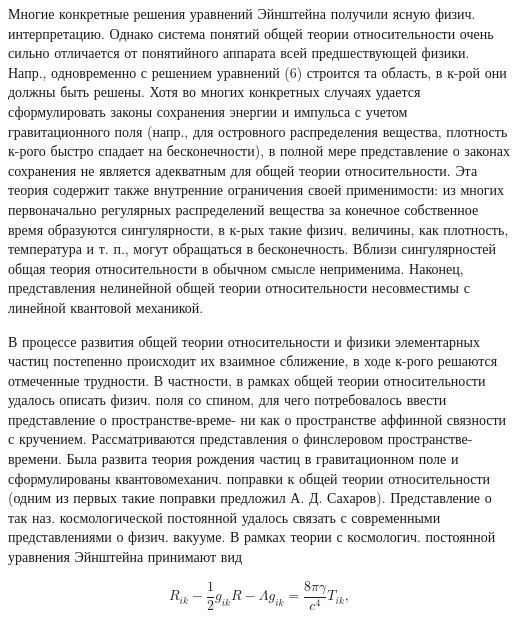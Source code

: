 \documentclass[10pt]{article}
\begin{document}
Многие конкретные решения уравнений Эйнштейна получили ясную физич. интерпретацию. Однако система понятий общей теории относительности очень сильно отличается от понятийного аппарата всей предшествующей физики. Напр., одновременно с решением уравнений (6) строится та область, в к-рой они должны быть решены. Хотя во многих конкретных случаях удается сформулировать законы сохранения энергии и импульса с учетом гравитационного поля (напр., для островного распределения вещества, плотность к-рого быстро спадает на бесконечности), в полной мере представление о законах сохранения не является адекватным для общей теории относительности. Эта теория содержит также внутренние ограничения своей применимости: из многих первоначально регулярных распределений вещества за конечное собственное время образуются сингулярности, в к-рых такие физич. величины, как плотность, температура и т. п., могут обращаться в бесконечность. Вблизи сингулярностей общая теория относительности в обычном смысле неприменима. Наконец, представления нелинейной общей теории относительности несовместимы с линейной квантовой механикой.



В процессе развития общей теории относительности и физики элементарных частиц постепенно происходит их взаимное сближение, в ходе к-рого решаются отмеченные трудности. В частности, в рамках общей теории относительности удалось описать физич. поля со спином, для чего потребовалось ввести представление о пространстве-време- ни как о пространстве аффинной связности с кручением. Рассматриваются представления о финслеровом пространстве-времени. Была развита теория рождения частиц в гравитационном поле и сформулированы квантовомеханич. поправки к общей теории относительности (одним из первых такие поправки предложил А. Д. Сахаров). Представление о так наз. космологической постоянной удалось связать с современными представлениями о физич. вакууме. В рамках теории с космологич. постоянной уравнения Эйнштейна принимают вид



\[

R_{i k}-\frac{1}{2} g_{i k} R-\Lambda g_{i k}=\frac{8 \pi \gamma}{c^{4}} T_{i k},

\]
\end{document}
